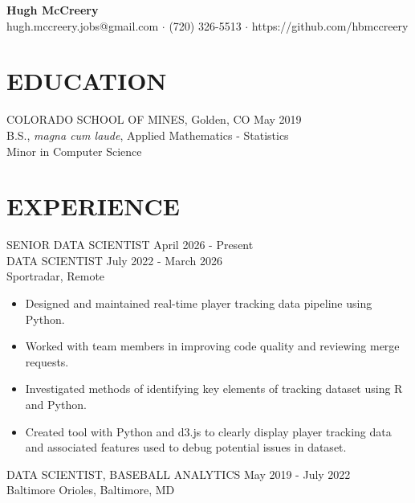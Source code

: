 \documentclass[11pt]{res} %
\begin{document}
 
	\begin{center}
 		\textbf{\LARGE Hugh McCreery} \\
 		hugh.mccreery.jobs@gmail.com $\cdot$ (720) 326-5513 $\cdot$ https://github.com/hbmccreery
	\end{center}
\vspace{-0.6in}
\begin{resume}
\hrulefill
\vspace{-0.2in}                                  
\section{EDUCATION} 
 \noindent COLORADO SCHOOL OF MINES, Golden, CO \hfill May 2019 \\
B.S., \textit{magna cum laude}, Applied Mathematics - Statistics\\
Minor in Computer Science \\
\vspace{-0.1in}
\hrulefill
\vspace{-0.1in}  
\section{EXPERIENCE} 
SENIOR DATA SCIENTIST \hfill April 2026 - Present	\\
DATA SCIENTIST \hfill July 2022 - March 2026	\\
Sportradar, Remote

\begin{itemize}
	\item Designed and maintained real-time player tracking data pipeline using Python.
	\item Worked with team members in improving code quality and reviewing merge requests.
	\item Investigated methods of identifying key elements of tracking dataset using R and Python.
	\item Created tool with Python and d3.js to clearly display player tracking data and associated features used to debug potential issues in dataset.  
\end{itemize}
\vspace{-0.15in} 
DATA SCIENTIST, BASEBALL ANALYTICS \hfill May 2019  - July 2022	\\
Baltimore Orioles, Baltimore, MD


\end{resume}
\end{document}
